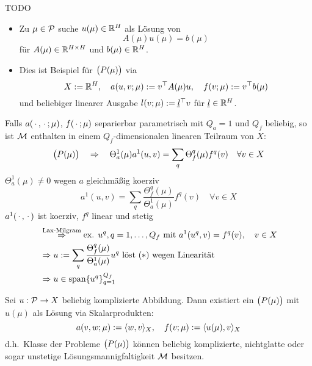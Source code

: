 \begin{bsp} \label{2.10}
	TODO
\end{bsp}

\begin{bsp}[Matrixgleichung] \beginwithlist
	\begin{itemize}
		\item Zu $\mu \in \mathcal{P}$ suche $u(\mu) \in \mathbb{R}^H$ als Lösung von
			\[
				A(\mu) u(\mu) = b(\mu)
			\]
			für $A(\mu) \in \mathbb{R}^{H \times H}$ und $b(\mu) \in \mathbb{R}^H$.
		\item Dies ist Beispiel für $\big(P(\mu)\big)$ via
			\[
				X := \mathbb{R}^H, \quad a(u,v;\mu) := v^\top A(\mu) u, \quad f(v;\mu) := v^\top b(\mu)
			\]
			und beliebiger linearer Ausgabe $l(v;\mu) := \ubar l^\top v$ für $\ubar l \in \R^H$.
	\end{itemize}
\end{bsp}

\begin{bsp}[$Q_a = 1$]
	Falls $a(\,\cdot\,,\,\cdot\,;\mu)$, $f(\,\cdot\,;\mu)$ separierbar parametrisch mit $Q_a = 1$ und $Q_f$ beliebig, so ist $\mathcal{M}$ enthalten in einem $Q_f$-dimensionalen linearen Teilraum von $X$:
	\[
		\big(P(\mu)\big) \quad \Rightarrow \quad \Theta_a^1(\mu) a^1(u,v) = \sum_q \Theta_f^q(\mu) f^q(v) \quad \forall v \in X
	\]
	$\Theta_a^1(\mu) \neq 0$ wegen $a$ gleichmäßig koerziv
	\[
		a^1(u,v) = \sum_q \frac{\Theta_f^q(\mu)}{\Theta_a^1(\mu)} f^q(v) \quad \forall v \in X \tag{$*$}
	\]
	$a^1(\,\cdot\,,\,\cdot\,)$ ist koerziv, $f^q$ linear und stetig
	\begin{align*}
		&\stackrel{\text{Lax-Milgram}}{\Rightarrow} \text{ex. } u^q, q=1,\dots,Q_f \text{ mit } a^1(u^q,v) = f^q(v), \quad v \in X\\
		&\Rightarrow u := \sum_q \frac{\Theta_f^q(\mu)}{\Theta_a^1(\mu)} u^q \text{ löst } (*) \text{ wegen Linearität}\\
		&\Rightarrow u \in \operatorname{span}\{u^q\}_{q=1}^{Q_f}
	\end{align*}
\end{bsp}

\begin{bsp}
	Sei $u : \mathcal{P} \to X$ beliebig komplizierte Abbildung.
	Dann existiert ein $\big(P(\mu)\big)$ mit $u(\mu)$ als Lösung via Skalarprodukten:
	\[
		a(v,w;\mu) := \langle w, v \rangle_X, \quad f(v;\mu) := \langle u(\mu), v \rangle_X
	\]
	d.h.\ Klasse der Probleme $\big(P(\mu)\big)$ können beliebig komplizierte, nichtglatte oder sogar unstetige Lösungsmannigfaltigkeit $\mathcal{M}$ besitzen.
\end{bsp}

